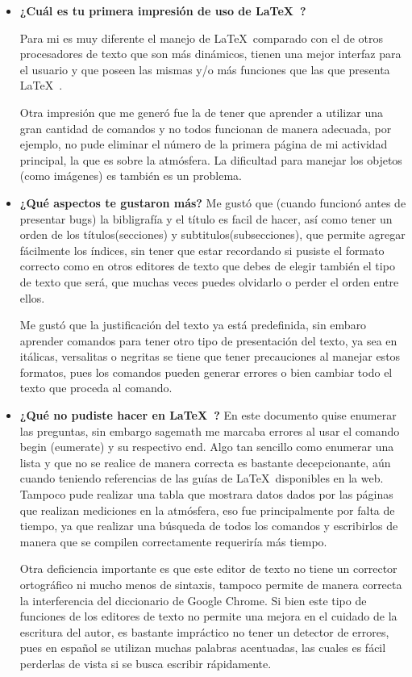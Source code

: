 \documentclass[12pt]{article}
\begin{document}
\begin{itemize}
\item \textbf{¿Cuál es tu primera impresión de uso de \LaTeX\ ?}

Para mi es muy diferente el manejo de \LaTeX\ comparado con el de otros procesadores de texto que son más dinámicos, tienen una mejor interfaz para el usuario y que poseen las mismas y/o más funciones que las que presenta \LaTeX\ .

Otra impresión que me generó fue la de tener que aprender a utilizar una gran cantidad de comandos y no todos funcionan de manera adecuada, por ejemplo, no pude eliminar el número de la primera página de mi actividad principal, la que es sobre la atmósfera. La dificultad para manejar los objetos (como imágenes) es también es un problema.

\item \textbf{¿Qué aspectos te gustaron más? }
Me gustó que (cuando funcionó antes de presentar bugs) la bibligrafía y el título es facil de hacer, así como tener un orden de los títulos(secciones) y subtitulos(subsecciones), que permite agregar fácilmente los índices, sin tener que estar recordando si pusiste el formato correcto como en otros editores de texto que debes de elegir también el tipo de texto que será, que muchas veces puedes olvidarlo o perder el orden entre ellos.

Me gustó que la justificación del texto ya está predefinida, sin embaro aprender comandos para tener otro tipo de presentación del texto, ya sea en itálicas, versalitas o negritas se tiene que tener precauciones al manejar estos formatos, pues los comandos pueden generar errores o bien cambiar todo el texto que proceda al comando.

\item \textbf{¿Qué no pudiste hacer en \LaTeX\ ?}
En este documento quise enumerar las preguntas, sin embargo sagemath me marcaba errores al usar el comando begin (eumerate) y su respectivo end. Algo tan sencillo como enumerar una lista y que no se realice de manera correcta es bastante decepcionante, aún cuando teniendo referencias de las guías de \LaTeX\ disponibles en la web. Tampoco pude realizar una tabla que mostrara datos dados por las páginas que realizan mediciones en la atmósfera, eso fue principalmente por falta de tiempo, ya que realizar una búsqueda de todos los comandos y escribirlos de manera que se compilen correctamente requeriría más tiempo. 

Otra deficiencia importante es que este editor de texto no tiene un corrector ortográfico ni mucho menos de sintaxis, tampoco permite de manera correcta la interferencia del diccionario de Google Chrome. Si bien este tipo de funciones de los editores de texto no permite una mejora en el cuidado de la escritura del autor, es bastante impráctico no tener un detector de errores, pues en español se utilizan muchas palabras acentuadas, las cuales es fácil perderlas de vista si se busca escribir rápidamente.


\end{itemize}
\end{document}
